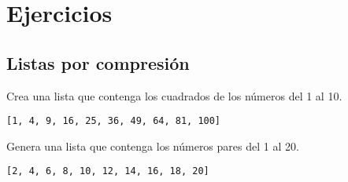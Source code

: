 \section{Ejercicios}

\subsection{Listas por compresión}

\begin{exercise} Crea una lista que contenga los cuadrados de los números del 1 al 10.

\begin{Shaded}
\begin{Highlighting}[]
\OperatorTok{=}\NormalTok{ [x}\OperatorTok{**}  \NormalTok{(}\NormalTok{, }\NormalTok{)]}
\end{Highlighting}
\end{Shaded}

\begin{verbatim}
[1, 4, 9, 16, 25, 36, 49, 64, 81, 100]

\end{verbatim}
\end{exercise}

\begin{exercise} Genera una lista que contenga los números pares del 1 al 20.
\begin{Shaded}
\begin{Highlighting}[]
\OperatorTok{=}\NormalTok{ [x } \NormalTok{(}\NormalTok{, }\NormalTok{) }\OperatorTok{\%}  \OperatorTok{==} \NormalTok{]}
\end{Highlighting}
\end{Shaded}

\begin{verbatim}
[2, 4, 6, 8, 10, 12, 14, 16, 18, 20]

\end{verbatim}
\end{exercise}

